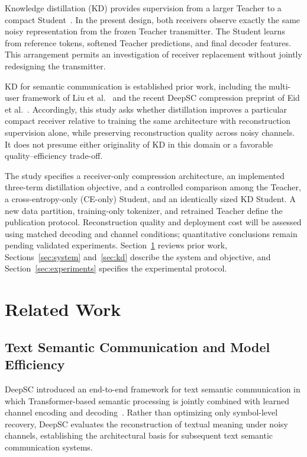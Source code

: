 \documentclass[conference]{IEEEtran}
\begin{document}
Knowledge distillation (KD) provides supervision from a larger Teacher to a compact Student~\cite{hinton2015distilling}. In the present design, both receivers observe exactly the same noisy representation from the frozen Teacher transmitter. The Student learns from reference tokens, softened Teacher predictions, and final decoder features. This arrangement permits an investigation of receiver replacement without jointly redesigning the transmitter.

KD for semantic communication is established prior work, including the multi-user framework of Liu et al.~\cite{liu2024kdsemcom} and the recent DeepSC compression preprint of Eid et al.~\cite{eid2026krumdeepsc}. Accordingly, this study asks whether distillation improves a particular compact receiver relative to training the same architecture with reconstruction supervision alone, while preserving reconstruction quality across noisy channels. It does not presume either originality of KD in this domain or a favorable quality--efficiency trade-off.

The study specifies a receiver-only compression architecture, an implemented three-term distillation objective, and a controlled comparison among the Teacher, a cross-entropy-only (CE-only) Student, and an identically sized KD Student. A new data partition, training-only tokenizer, and retrained Teacher define the publication protocol. Reconstruction quality and deployment cost will be assessed using matched decoding and channel conditions; quantitative conclusions remain pending validated experiments. Section~\ref{sec:related-work} reviews prior work, Sections~\ref{sec:system} and~\ref{sec:kd} describe the system and objective, and Section~\ref{sec:experiments} specifies the experimental protocol.


\section{Related Work}
\label{sec:related-work}

\subsection{Text Semantic Communication and Model Efficiency}
DeepSC introduced an end-to-end framework for text semantic communication in which Transformer-based semantic processing is jointly combined with learned channel encoding and decoding~\cite{xie2021deepsc}. Rather than optimizing only symbol-level recovery, DeepSC evaluates the reconstruction of textual meaning under noisy channels, establishing the architectural basis for subsequent text semantic communication systems.
\end{document}
